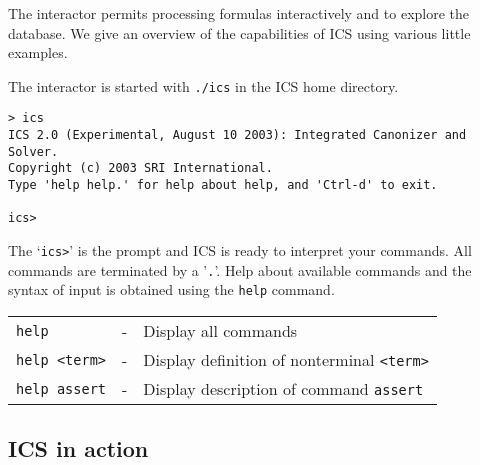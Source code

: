 \documentclass[12pt]{article}
\begin{document}
The interactor permits processing formulas interactively and to 
explore the database.  We give an overview of the capabilities 
of ICS using various little examples.

The interactor is started with \texttt{./ics} in the ICS home directory.
\begin{verbatim}
> ics
ICS 2.0 (Experimental, August 10 2003): Integrated Canonizer and Solver.
Copyright (c) 2003 SRI International.
Type 'help help.' for help about help, and 'Ctrl-d' to exit.

ics> 
\end{verbatim}
The `\texttt{ics>}' is the prompt and ICS is ready to interpret your commands.
All commands are terminated by a '\texttt{.}'. Help about available commands
and the syntax of input is obtained using the \texttt{help} command.

  \begin{tabular}{lcl}
  \texttt{help}        & - & Display all commands \\
  \texttt{help <term>} & - & Display definition of nonterminal {\tt <term>} \\
  \texttt{help assert} & - & Display description of command \texttt{assert}\\
  \end{tabular}


\subsection{ICS in action}
\end{document}
